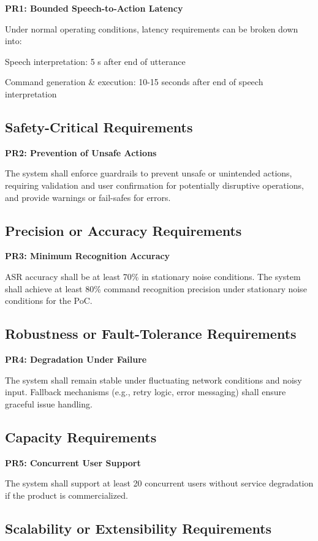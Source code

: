 \documentclass[11pt]{article}
\begin{document}
\textbf{PR1: Bounded Speech-to-Action Latency}\label{req:PR1}

Under normal operating conditions, latency requirements can be broken down into:

Speech interpretation: 5 s after end of utterance

Command generation \& execution: 10-15 seconds after end of speech interpretation
\subsection{Safety-Critical Requirements}\label{subsec:safety}

\textbf{PR2: Prevention of Unsafe Actions}\label{req:PR2}

The system shall enforce guardrails to prevent unsafe or unintended actions, requiring validation and user confirmation for potentially disruptive operations, and provide warnings or fail-safes for errors.
\subsection{Precision or Accuracy Requirements}\label{subsec:accuracy}

\textbf{PR3: Minimum Recognition Accuracy}\label{req:PR3}

ASR accuracy shall be at least 70\% in stationary noise conditions. The system shall achieve at least 80\% command recognition precision under stationary noise conditions for the PoC.
\subsection{Robustness or Fault-Tolerance Requirements}\label{subsec:robustness}

\textbf{PR4: Degradation Under Failure}\label{req:PR4}

The system shall remain stable under fluctuating network conditions and noisy input. Fallback mechanisms (e.g., retry logic, error messaging) shall ensure graceful issue handling.
\subsection{Capacity Requirements}\label{subsec:capacity}

\textbf{PR5: Concurrent User Support}\label{req:PR5}

The system shall support at least 20 concurrent users without service degradation if the product is commercialized.
\subsection{Scalability or Extensibility Requirements}\label{subsec:scalability}
\end{document}
